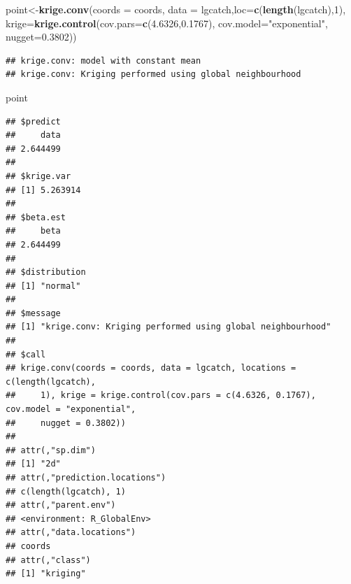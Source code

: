 \documentclass[]{article}
\newenvironment{Shaded}{\begin{snugshade}}{\end{snugshade}}
\newcommand{\KeywordTok}[1]{\textcolor[rgb]{0.13,0.29,0.53}{\textbf{#1}}}
\newcommand{\DataTypeTok}[1]{\textcolor[rgb]{0.13,0.29,0.53}{#1}}
\newcommand{\DecValTok}[1]{\textcolor[rgb]{0.00,0.00,0.81}{#1}}
\newcommand{\FloatTok}[1]{\textcolor[rgb]{0.00,0.00,0.81}{#1}}
\newcommand{\StringTok}[1]{\textcolor[rgb]{0.31,0.60,0.02}{#1}}
\newcommand{\OperatorTok}[1]{\textcolor[rgb]{0.81,0.36,0.00}{\textbf{#1}}}
\newcommand{\NormalTok}[1]{#1}
\begin{document}
\begin{Shaded}
\begin{Highlighting}[]
\NormalTok{point<-}\KeywordTok{krige.conv}\NormalTok{(}\DataTypeTok{coords =}\NormalTok{ coords, }\DataTypeTok{data =}\NormalTok{ lgcatch,}\DataTypeTok{loc=}\KeywordTok{c}\NormalTok{(}\KeywordTok{length}\NormalTok{(lgcatch),}\DecValTok{1}\NormalTok{),}
                  \DataTypeTok{krige=}\KeywordTok{krige.control}\NormalTok{(}\DataTypeTok{cov.pars=}\KeywordTok{c}\NormalTok{(}\FloatTok{4.6326}\NormalTok{,}\FloatTok{0.1767}\NormalTok{),}
                                      \DataTypeTok{cov.model=}\StringTok{"exponential"}\NormalTok{,}
                                      \DataTypeTok{nugget=}\FloatTok{0.3802}\NormalTok{))}
\end{Highlighting}
\end{Shaded}

\begin{verbatim}
## krige.conv: model with constant mean
## krige.conv: Kriging performed using global neighbourhood
\end{verbatim}

\begin{Shaded}
\begin{Highlighting}[]
\NormalTok{point}
\end{Highlighting}
\end{Shaded}

\begin{verbatim}
## $predict
##     data 
## 2.644499 
## 
## $krige.var
## [1] 5.263914
## 
## $beta.est
##     beta 
## 2.644499 
## 
## $distribution
## [1] "normal"
## 
## $message
## [1] "krige.conv: Kriging performed using global neighbourhood"
## 
## $call
## krige.conv(coords = coords, data = lgcatch, locations = c(length(lgcatch), 
##     1), krige = krige.control(cov.pars = c(4.6326, 0.1767), cov.model = "exponential", 
##     nugget = 0.3802))
## 
## attr(,"sp.dim")
## [1] "2d"
## attr(,"prediction.locations")
## c(length(lgcatch), 1)
## attr(,"parent.env")
## <environment: R_GlobalEnv>
## attr(,"data.locations")
## coords
## attr(,"class")
## [1] "kriging"
\end{verbatim}

\begin{Shaded}
\end{Shaded}
\end{document}
